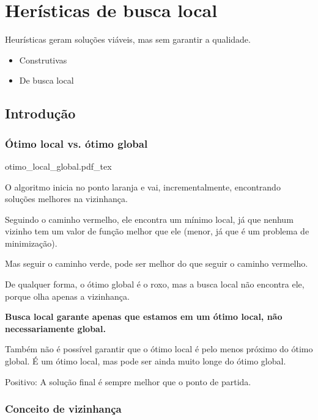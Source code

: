 \chapter{Herísticas de busca local}
\label{chp:semana3}

Heurísticas geram soluções viáveis, mas sem garantir a qualidade.

\begin{itemize}
    \item Construtivas
    \item De busca local
\end{itemize}

\section{Introdução}

\subsection{Ótimo local vs. ótimo global}

\begin{center}
    \def\svgwidth{.75\linewidth}
    {otimo_local_global.pdf_tex}
\end{center}

O algoritmo inicia no ponto laranja e vai, incrementalmente, encontrando soluções melhores na vizinhança.

Seguindo o caminho vermelho, ele encontra um mínimo local, já que nenhum vizinho tem um valor de função melhor que ele (menor, já que é um problema de minimização).

Mas seguir o caminho verde, pode ser melhor do que seguir o caminho vermelho.

De qualquer forma, o ótimo global é o roxo, mas a busca local não encontra ele, porque olha apenas a vizinhança.

\textbf{Busca local garante apenas que estamos em um ótimo local, não necessariamente global.}

Também não é possível garantir que o ótimo local é pelo menos próximo do ótimo global. É um ótimo local, mas pode ser ainda muito longe do ótimo global.

Positivo: A solução final é sempre melhor que o ponto de partida.

\subsection{Conceito de vizinhança}

